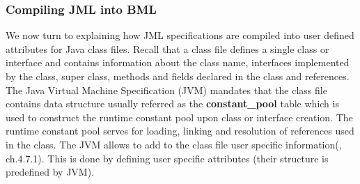 \subsubsection{Compiling JML into BML}\label{comJML}


We now turn to explaining how JML specifications are compiled into user defined attributes for Java class files. Recall that a class file defines
a single class or interface and contains information about  the class name, interfaces implemented by the class, super class, methods and fields declared in the class and references. The Java Virtual Machine Specification (JVM) \cite{VMSpec} mandates that the class file contains data structure usually referred as the \textbf{constant\_pool} table which is used to construct the runtime constant pool upon class or interface creation. The runtime constant pool serves for loading, linking and resolution of references used in the class. The JVM allows to add to the class file user specific information(\cite{VMSpec}, ch.4.7.1). This is done by defining user specific attributes  (their structure is predefined by JVM).

